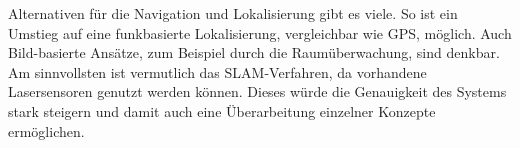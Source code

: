 Alternativen für die Navigation und Lokalisierung gibt es viele. So ist ein Umstieg auf eine funkbasierte Lokalisierung, vergleichbar wie GPS, möglich. Auch Bild-basierte Ansätze, zum Beispiel durch die Raumüberwachung, sind denkbar. Am sinnvollsten ist vermutlich das SLAM-Verfahren, da vorhandene Lasersensoren genutzt werden können. Dieses würde die Genauigkeit des Systems stark steigern und damit auch eine Überarbeitung einzelner Konzepte ermöglichen.


